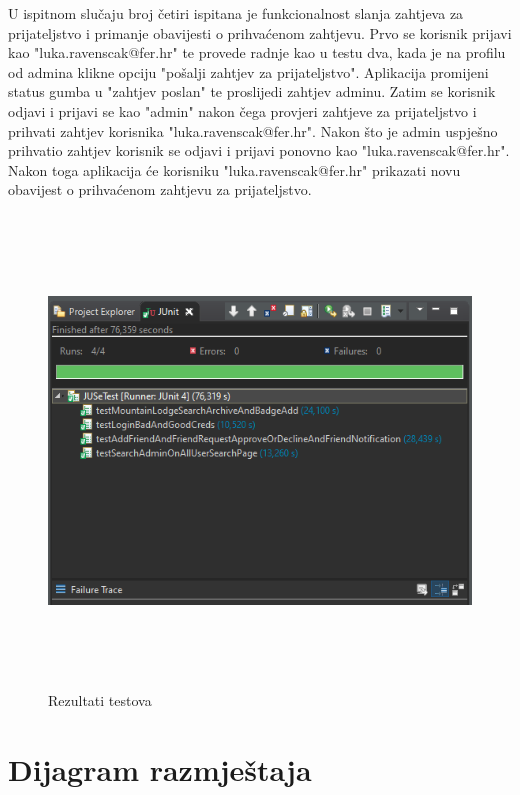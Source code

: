  		U ispitnom slučaju broj četiri ispitana je funkcionalnost slanja zahtjeva za prijateljstvo i primanje obavijesti o prihvaćenom zahtjevu. Prvo se korisnik prijavi kao "luka.ravenscak@fer.hr" te provede radnje kao u testu dva, kada je na profilu od admina klikne opciju "pošalji zahtjev za prijateljstvo". Aplikacija promijeni status gumba u "zahtjev poslan" te proslijedi zahtjev adminu. Zatim se korisnik odjavi i prijavi se kao "admin" nakon čega provjeri zahtjeve za prijateljstvo i prihvati zahtjev korisnika "luka.ravenscak@fer.hr". Nakon što je admin uspješno prihvatio zahtjev korisnik se odjavi i prijavi ponovno kao "luka.ravenscak@fer.hr". Nakon toga aplikacija će korisniku "luka.ravenscak@fer.hr" prikazati novu obavijest o prihvaćenom zahtjevu za prijateljstvo. 
 		
		
		\begin{figure}[H]
			\includegraphics[scale=0.6, height=125mm, width=165mm]{slike/test_results.png} %
			\centering
			\caption{Rezultati testova}
			\label{fig:test_results}
		\end{figure}
		
			\eject 
		
		
		\section{Dijagram razmještaja}
			
